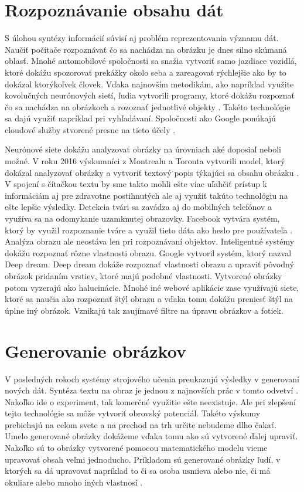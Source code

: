 \section{Rozpoznávanie obsahu dát}
S úlohou syntézy informácií súvisí aj problém reprezentovania významu dát.
Naučiť počítače rozpoznávať čo sa nachádza na obrázku je dnes silno skúmaná oblasť.
Mnohé automobilové spoločnosti sa snažia vytvoriť samo jazdiace vozidlá, ktoré dokážu spozorovať prekážky okolo seba a zareagovať rýchlejšie ako by to dokázal ktorýkoľvek človek.
Vďaka najnovším metodikám, ako napríklad využite kovolučných neurónových sietí,  ľudia vytvorili programy, ktoré dokážu rozpoznať čo sa nachádza na obrázkoch a rozoznať jednotlivé objekty \cite{tensorFlow}.
Takéto technológie sa dajú využiť napríklad pri vyhľadávaní. Spoločnosti ako Google ponúkajú cloudové služby stvorené presne na tieto účely \cite{googleCloud}.

Neurónové siete dokážu analyzovať obrázky na úrovniach aké doposiaľ neboli možné.
V roku 2016 výskumníci z Montrealu a Toronta vytvorili model, ktorý dokázal analyzovať obrázky a vytvoriť textový popis týkajúci sa obsahu obrázku \cite{imageCaption}.
V spojení s čítačkou textu by sme takto mohli ešte viac uľahčiť prístup k informáciám aj pre zdravotne postihnutých ale aj využiť takúto technológiu na ešte lepšie výsledky.
Detekcia tvári sa zavádza aj do mobilných telefónov a využíva sa na odomykanie uzamknutej obrazovky. Facebook vytvára systém, ktorý by využil rozpoznanie tváre a využil tieto dáta ako heslo pre používateľa \cite{facebook}.
Analýza obrazu ale neostáva len pri rozpoznávaní objektov. Inteligentné systémy dokážu rozpoznať rôzne vlastnosti obrazu.
Google vytvoril systém, ktorý nazval Deep dream. Deep dream dokáže rozpoznať vlastnosti obrazu a upraviť pôvodný obrázok pridaním vrstiev, ktoré majú podobné vlastnosti.
Vytvorené obrázky potom vyzerajú ako halucinácie.
Mnohé iné webové aplikácie zase využívajú siete, ktoré sa naučia ako rozpoznať štýl obrazu a vďaka tomu dokážu preniesť štýl na úplne iný obrázok. Vznikajú tak zaujímavé filtre na úpravu obrázkov a fotiek. 

\section{Generovanie obrázkov}
V posledných rokoch systémy strojového učenia preukazujú výsledky v generovaní nových dát.
Syntéza textu na obraz je jednou z najnovších prác v tomto odvetví \cite{text2image}.
Nakoľko ide o experiment, tak komerčné využitie ešte neexistuje. Ale pri zlepšení tejto technológie sa môže vytvoriť obrovský potenciál.
Takéto výskumy prebiehajú na celom svete a na prechod na trh určite nebudeme dlho čakať.
Umelo generované obrázky dokážeme vďaka tomu ako sú vytvorené ďalej upraviť.
Nakoľko sú to obrázky vytvorené pomocou matematického modelu vieme upravovať obsah veľmi jednoducho.
Príkladom sú generované obrázky ľudí, v ktorých sa dá upravovať napríklad to či sa osoba usmieva alebo nie, či má okuliare alebo mnoho iných vlastnosí \cite{DCGAN}.
